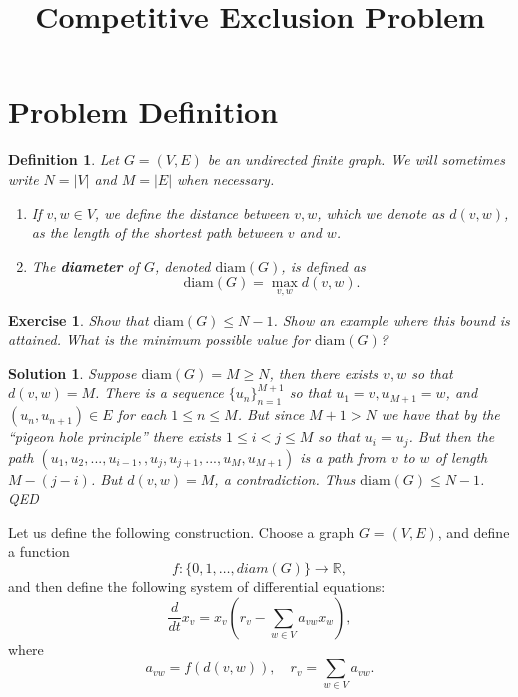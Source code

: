 \documentclass{article}
\title{Competitive Exclusion Problem}
\author{}
\newcommand{\R}{\mathbb{R}}
\newtheorem{define}[thm]{Definition}
\newtheorem{exercise}[thm]{Exercise}
\newtheorem{soln}[thm]{Solution}
\newcommand{\1}{\mathbf{1}}
\newcommand{\0}{\mathbf{0}}
\newcommand{\be}{\begin{enumerate}}
\newcommand{\ee}{\end{enumerate}}
\newcommand{\ii}{\item}
\newcommand{\diam}{\mathrm{diam}}
\begin{document}
\maketitle


\section{Problem Definition}


\begin{define}
Let $G=(V,E)$ be an undirected finite graph.  We will sometimes write $N = |V|$ and $M=|E|$ when necessary.

\be

\ii If $v,w\in V$, we define the distance between $v,w$, which we denote as $d(v,w)$, as the length of the shortest path between $v$ and $w$.

\ii The {\bf diameter} of $G$, denoted $\diam(G)$, is defined as 
\begin{equation*}
  \diam(G) = \max_{v,w} d(v,w).
\end{equation*}


\ee


\end{define}


\begin{exercise}
  Show that $\diam(G) \le N-1$.  Show an example where this bound is attained.  What is the minimum possible value for $\diam(G)$?
\end{exercise}
\begin{soln}
Suppose $\diam(G) = M \geq N$, then there exists $v,w$ so that $d(v,w) = M$.  There is a sequence $\{u_n\}_{n=1}^{M+1}$ so that $u_1 = v, u_{M+1} = w$, and $(u_n,u_{n+1}) \in E$ for each $1\leq n\leq M$.  But since $M+1 > N$ we have that by the ``pigeon hole principle'' there exists $1\leq i < j \leq M$ so that $u_i=u_j$.  But then the path $(u_1,u_2,...,u_{i-1},,u_j,u_{j+1},...,u_M,u_{M+1})$ is a path from $v$ to $w$ of length $M-(j-i)$.  But $d(v,w) = M$, a contradiction.  Thus $\diam(G) \le N-1$.  QED
\end{soln}

Let us define the following construction.  Choose a graph $G=(V,E)$, and define a function
\begin{equation*}
  f\colon\{0,1,\dots,diam(G)\}\to \R,
\end{equation*}
and then define the following system of differential equations:
\begin{equation}\label{eq:ODE}
  \frac{d}{dt}x_v = x_v (r_v - \sum_{w\in V} a_{vw} x_w),
\end{equation}
where
\begin{equation*}
  a_{vw} = f(d(v,w)),\quad r_v = \sum_{w\in V}a_{vw}.
\end{equation*}
\end{document}
